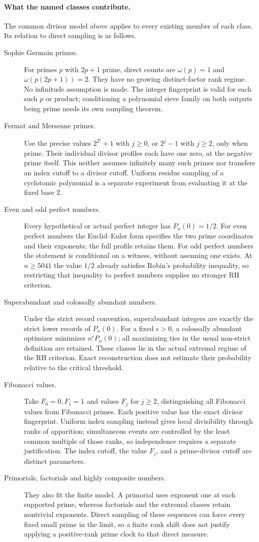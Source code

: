 \documentclass[11pt]{article}
\theoremstyle{definition}
\begin{document}
\paragraph{What the named classes contribute.}
The common divisor model above applies to every existing member of
each class. Its relation to direct sampling is as follows.
\begin{description}
\item[Sophie Germain primes.]
For primes $p$ with $2p+1$ prime, direct counts are
$\omega(p)=1$ and $\omega(p(2p+1))=2$.
They have no growing distinct-factor rank regime.
No infinitude assumption is made. The integer fingerprint is valid
for each such $p$ or product; conditioning a polynomial sieve family
on both outputs being prime needs its own sampling theorem.
\item[Fermat and Mersenne primes.]
Use the precise values $2^{2^j}+1$ with $j\ge0$, or $2^j-1$
with $j\ge2$, only when prime.
Their individual divisor profiles each have one zero, at the
negative prime itself. This neither assumes infinitely many such
primes nor transfers an index cutoff to a divisor cutoff.
Uniform residue sampling of a cyclotomic polynomial is a separate
experiment from evaluating it at the fixed base $2$.
\item[Even and odd perfect numbers.]
Every hypothetical or actual perfect integer has $P_n(0)=1/2$.
For even perfect numbers the Euclid--Euler form specifies the two
prime coordinates and their exponents; the full profile retains them.
For odd perfect numbers the statement is conditional on a witness,
without assuming one exists. At $n\ge5041$ the value $1/2$ already
satisfies Robin's probability inequality, so restricting that
inequality to perfect numbers supplies no stronger RH criterion.
\item[Superabundant and colossally abundant numbers.]
Under the strict record convention, superabundant integers are
exactly the strict lower records of $P_n(0)$.
For a fixed $\epsilon>0$, a colossally abundant optimizer minimizes
$n^\epsilon P_n(0)$; all maximizing ties in the usual non-strict
definition are retained. These classes lie in the actual extremal
regime of the RH criterion. Exact reconstruction does not estimate
their probability relative to the critical threshold.
\item[Fibonacci values.]
Take $F_0=0,F_1=1$ and values $F_j$ for $j\ge2$,
distinguishing all Fibonacci values from Fibonacci primes.
Each positive value has the exact divisor fingerprint.
Uniform index sampling instead gives local divisibility through
ranks of apparition; simultaneous events are controlled by the
least common multiple of those ranks, so independence requires
a separate justification. The index cutoff, the value $F_j$,
and a prime-divisor cutoff are distinct parameters.
\item[Primorials, factorials and highly composite numbers.]
They also fit the finite model. A primorial uses exponent one at
each supported prime, whereas factorials and the extremal classes
retain nontrivial exponents. Direct sampling of these sequences
can force every fixed small prime in the limit, so a finite rank
shift does not justify applying a positive-rank prime clock to
that direct measure.
\end{description}
\end{document}
